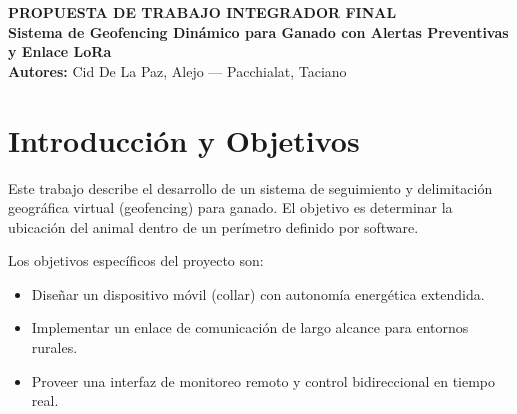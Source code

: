 \documentclass[11pt,a4paper]{article}
\begin{document}
\begin{center}
    {\bfseries\large PROPUESTA DE TRABAJO INTEGRADOR FINAL} \\[0.15cm]
    {\bfseries\Large Sistema de Geofencing Dinámico para Ganado con Alertas Preventivas y Enlace LoRa} \\[0.15cm]
    \textbf{Autores:} Cid De La Paz, Alejo --- Pacchialat, Taciano
\end{center}

\vspace{-0.2cm}

\section{Introducción y Objetivos}
Este trabajo describe el desarrollo de un sistema de seguimiento y delimitación geográfica virtual (geofencing) para ganado. El objetivo es determinar la ubicación del animal dentro de un perímetro definido por software.

Los objetivos específicos del proyecto son:
\begin{itemize}
    \item Diseñar un dispositivo móvil (collar) con autonomía energética extendida.
    \item Implementar un enlace de comunicación de largo alcance para entornos rurales.
    \item Proveer una interfaz de monitoreo remoto y control bidireccional en tiempo real.
\end{itemize}
\end{document}
